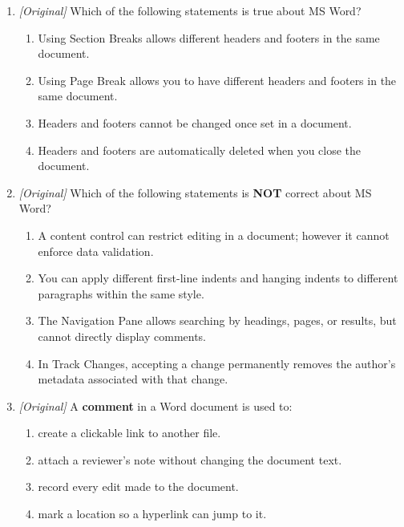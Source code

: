 \documentclass[11pt]{article}
\begin{document}
\begin{enumerate}[label=\textbf{Q\arabic*.}, leftmargin=*]
  different parts of the document?
  \begin{enumerate}[label=\Alph*.]
    \item Page Break
    \item Line Break
    \item Column Break
    \item Section Break
  \end{enumerate}
\item \textit{[Original]} Which of the following statements
is true about MS Word?
  \begin{enumerate}[label=\Alph*.]
    \item Using Section Breaks allows different headers and footers in the same
      document.
    \item Using Page Break allows you to have different headers and footers in
      the same document.
    \item Headers and footers cannot be changed once set in a document.
    \item Headers and footers are automatically deleted when you close the
      document.
  \end{enumerate}
\item \textit{[Original]} Which of the following statements
is \textbf{NOT} correct about MS Word?
  \begin{enumerate}[label=\Alph*.]
    \item A content control can restrict editing in a document; however it
      cannot enforce data validation.
    \item You can apply different first-line indents and hanging indents to
      different paragraphs within the same style.
    \item The Navigation Pane allows searching by headings, pages, or results,
      but cannot directly display comments.
    \item In Track Changes, accepting a change permanently removes the author's
      metadata associated with that change.
  \end{enumerate}
\item \textit{[Original]} A \textbf{comment} in a Word document is used to:
  \begin{enumerate}[label=\Alph*.]
    \item create a clickable link to another file.
    \item attach a reviewer's note without changing the document text.
    \item record every edit made to the document.
    \item mark a location so a hyperlink can jump to it.

\end{enumerate}
\end{enumerate}
\end{document}
